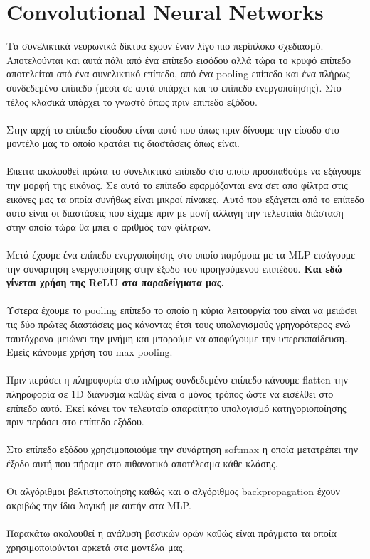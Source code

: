 \documentclass[11pt, letterpaper]{article}
\begin{document}
\section*{Convolutional Neural Networks}
Τα συνελικτικά νευρωνικά δίκτυα έχουν έναν λίγο πιο περίπλοκο σχεδιασμό. Αποτελούνται και αυτά πάλι από ένα επίπεδο εισόδου αλλά τώρα το κρυφό επίπεδο
αποτελείται από ένα συνελικτικό επίπεδο, από ένα pooling επίπεδο και ένα πλήρως συνδεδεμένο επίπεδο (μέσα σε αυτά υπάρχει και το επίπεδο ενεργοποίησης). Στο τέλος κλασικά υπάρχει το γνωστό όπως πριν 
επίπεδο εξόδου. \\ \\
Στην αρχή το επίπεδο είσοδου είναι αυτό που όπως πριν δίνουμε την είσοδο στο μοντέλο μας το οποίο κρατάει τις διαστάσεις όπως είναι. \\ \\
Έπειτα ακολουθεί πρώτα το συνελικτικό επίπεδο στο οποίο προσπαθούμε να εξάγουμε την μορφή της εικόνας. Σε αυτό το επίπεδο εφαρμόζονται 
ενα σετ απο φίλτρα στις εικόνες μας τα οποία συνήθως είναι μικροί πίνακες. Αυτό που εξάγεται από το επίπεδο αυτό είναι οι διαστάσεις που είχαμε πριν
με μονή αλλαγή την τελευταία διάσταση στην οποία τώρα θα μπει ο αριθμός των φίλτρων. \\ \\
Μετά έχουμε ένα επίπεδο ενεργοποίησης στο οποίο παρόμοια με τα MLP εισάγουμε την συνάρτηση ενεργοποίησης στην έξοδο του προηγούμενου επιπέδου.
\textbf{Και εδώ γίνεται χρήση της ReLU στα παραδείγματα μας.} \\ \\
Ύστερα  έχουμε το pooling επίπεδο το οποίο η κύρια λειτουργία του είναι να μειώσει τις δύο πρώτες διαστάσεις μας κάνοντας έτσι 
τους υπολογισμούς γρηγορότερος ενώ ταυτόχρονα μειώνει την μνήμη και μπορούμε να αποφύγουμε την υπερεκπαίδευση. Εμείς κάνουμε χρήση του max pooling. \\ \\
Πριν περάσει η πληροφορία στο πλήρως συνδεδεμένο επίπεδο κάνουμε flatten την πληροφορία σε 1D διάνυσμα καθώς είναι ο μόνος τρόπος ώστε να 
εισέλθει στο επίπεδο αυτό. Εκεί κάνει τον τελευταίο απαραίτητο υπολογισμό κατηγοριοποίησης πριν περάσει στο επίπεδο εξόδου. \\ \\
Στο επίπεδο εξόδου χρησιμοποιούμε την συνάρτηση softmax η οποία μετατρέπει την έξοδο αυτή που πήραμε στο πιθανοτικό αποτέλεσμα κάθε κλάσης. \\ \\
Οι αλγόριθμοι βελτιστοποίησης καθώς και ο αλγόριθμος backpropagation έχουν ακριβώς την ίδια λογική με αυτήν στα MLP. \\ \\
Παρακάτω ακολουθεί η ανάλυση βασικών ορών καθώς είναι πράγματα τα οποία χρησιμοποιούνται αρκετά στα μοντέλα μας.
\end{document}
